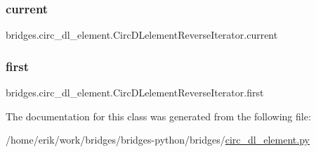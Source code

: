 \subsubsection{\texorpdfstring{current}{current}}
{\footnotesize\ttfamily bridges.\+circ\+\_\+dl\+\_\+element.\+Circ\+D\+Lelement\+Reverse\+Iterator.\+current}

\mbox{\label{classbridges_1_1circ__dl__element_1_1_circ_d_lelement_reverse_iterator_a6e85b7558acd1eafd564f19e7c269adb}} 
\subsubsection{\texorpdfstring{first}{first}}
{\footnotesize\ttfamily bridges.\+circ\+\_\+dl\+\_\+element.\+Circ\+D\+Lelement\+Reverse\+Iterator.\+first}



The documentation for this class was generated from the following file\+:\begin{DoxyCompactItemize}
\item 
/home/erik/work/bridges/bridges-\/python/bridges/\hyperlink{circ__dl__element_8py}{circ\+\_\+dl\+\_\+element.\+py}\end{DoxyCompactItemize}
